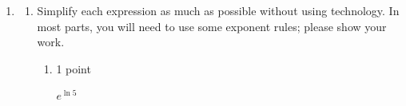 \documentclass{article}
\begin{document}
\begin{enumerate}
\begin{enumerate}
  \item

    \begin{grading}
      1 point
    \end{grading}

    \begin{problem}[\stretch{0.15}]
      What is $\displaystyle \lim_{x \rightarrow -1^+} [3 - \log_2(x + 1)]$?
    \end{problem}

    \begin{solution}
      Based on our graph, 
      $\lim\limits_{x \to -1^+} [3 - \log_2(x + 1)] = \boxed{\infty}$.
    \end{solution}

  \item

    \begin{grading}
      1 point
    \end{grading}

    \begin{problem}[\nstretch{0.15}]
      What is $\displaystyle \lim_{x \rightarrow \infty} [3 - \log_2(x + 1)]$?
    \end{problem}

    \begin{solution}
      Based on our graph, 
      $\lim\limits_{x \to \infty} [3 - \log_2(x + 1)] = \boxed{-\infty}$.
    \end{solution}

  \end{enumerate} 

\item  \begin{enumerate}
  \item \label{simplify-exp-of-log-expressions-2}

    Simplify each expression as much as possible without using technology. In most parts, you will need to use some exponent rules; please show your work.

    \begin{enumerate}

    \item

      \begin{grading}
        1 point
      \end{grading}

      \begin{problem}[\stretch{0.5}]
        $\displaystyle e^{ \ln 5}$
      \end{problem}


\end{enumerate}
\end{enumerate}
\end{enumerate}
\end{document}
